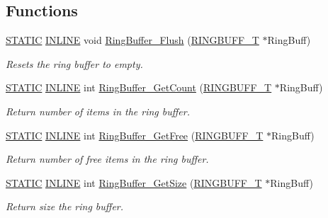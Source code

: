 \subsection*{Functions}
\begin{DoxyCompactItemize}
\item 
\hyperlink{group__LPC__Types__Public__Macros_ga10b2d890d871e1489bb02b7e70d9bdfb}{S\+T\+A\+T\+IC} \hyperlink{group__LPC__Types__Public__Types_ga2eb6f9e0395b47b8d5e3eeae4fe0c116}{I\+N\+L\+I\+NE} void \hyperlink{group__Ring__Buffer_ga5f66a5dd980ef03877cf8e0c96ad4ebb}{Ring\+Buffer\+\_\+\+Flush} (\hyperlink{structRINGBUFF__T}{R\+I\+N\+G\+B\+U\+F\+F\+\_\+T} $\ast$Ring\+Buff)
\begin{DoxyCompactList}\small\item\em Resets the ring buffer to empty. \end{DoxyCompactList}\item 
\hyperlink{group__LPC__Types__Public__Macros_ga10b2d890d871e1489bb02b7e70d9bdfb}{S\+T\+A\+T\+IC} \hyperlink{group__LPC__Types__Public__Types_ga2eb6f9e0395b47b8d5e3eeae4fe0c116}{I\+N\+L\+I\+NE} int \hyperlink{group__Ring__Buffer_ga7b69777c35694637acaf39e6bfcc1822}{Ring\+Buffer\+\_\+\+Get\+Count} (\hyperlink{structRINGBUFF__T}{R\+I\+N\+G\+B\+U\+F\+F\+\_\+T} $\ast$Ring\+Buff)
\begin{DoxyCompactList}\small\item\em Return number of items in the ring buffer. \end{DoxyCompactList}\item 
\hyperlink{group__LPC__Types__Public__Macros_ga10b2d890d871e1489bb02b7e70d9bdfb}{S\+T\+A\+T\+IC} \hyperlink{group__LPC__Types__Public__Types_ga2eb6f9e0395b47b8d5e3eeae4fe0c116}{I\+N\+L\+I\+NE} int \hyperlink{group__Ring__Buffer_ga75424687def8979742338366d39c8559}{Ring\+Buffer\+\_\+\+Get\+Free} (\hyperlink{structRINGBUFF__T}{R\+I\+N\+G\+B\+U\+F\+F\+\_\+T} $\ast$Ring\+Buff)
\begin{DoxyCompactList}\small\item\em Return number of free items in the ring buffer. \end{DoxyCompactList}\item 
\hyperlink{group__LPC__Types__Public__Macros_ga10b2d890d871e1489bb02b7e70d9bdfb}{S\+T\+A\+T\+IC} \hyperlink{group__LPC__Types__Public__Types_ga2eb6f9e0395b47b8d5e3eeae4fe0c116}{I\+N\+L\+I\+NE} int \hyperlink{group__Ring__Buffer_ga2fc4b40b03afb19c8ea942da3cf3faf1}{Ring\+Buffer\+\_\+\+Get\+Size} (\hyperlink{structRINGBUFF__T}{R\+I\+N\+G\+B\+U\+F\+F\+\_\+T} $\ast$Ring\+Buff)
\begin{DoxyCompactList}\small\item\em Return size the ring buffer. \end{DoxyCompactList}\item 

\end{DoxyCompactItemize}
